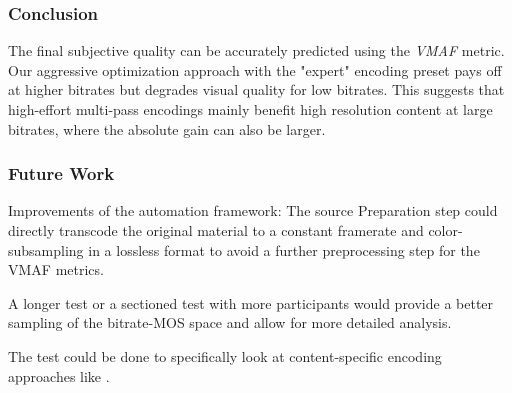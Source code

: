 \subsubsection{Conclusion}
The final subjective quality can be accurately predicted using the \textit{VMAF} metric.
Our aggressive optimization approach with the "expert" encoding preset pays off at higher bitrates but degrades visual quality for low bitrates. This suggests that high-effort multi-pass encodings mainly benefit high resolution content at large bitrates, where the absolute gain can also be larger.


\subsubsection{Future Work}
Improvements of the automation framework: The source Preparation step could directly transcode the original material to a constant framerate and color-subsampling in a lossless format to avoid a further preprocessing step for the VMAF metrics.

A longer test or a sectioned test with more participants would provide a better sampling of the bitrate-MOS space and allow for more detailed analysis.

The test could be done to specifically look at content-specific encoding approaches like \cite{cock:2016:titleencode}.

